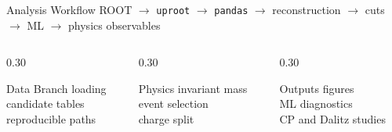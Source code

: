 \documentclass[aspectratio=169,10pt]{beamer}
\begin{document}
\begin{frame}{Analysis Workflow}
  \centering
  \vspace{0.2cm}
  {\large
  ROOT \(\rightarrow\) \texttt{uproot} \(\rightarrow\) \texttt{pandas}
  \(\rightarrow\) reconstruction \(\rightarrow\) cuts
  \(\rightarrow\) ML \(\rightarrow\) physics observables}

  \vspace{0.8cm}
  \begin{columns}[T,onlytextwidth]
    \begin{column}{0.30\textwidth}
      \begin{block}{Data}
        Branch loading\\
        candidate tables\\
        reproducible paths
      \end{block}
    \end{column}
    \begin{column}{0.30\textwidth}
      \begin{block}{Physics}
        invariant mass\\
        event selection\\
        charge split
      \end{block}
    \end{column}
    \begin{column}{0.30\textwidth}
      \begin{block}{Outputs}
        figures\\
        ML diagnostics\\
        CP and Dalitz studies
      \end{block}
    \end{column}
  \end{columns}
\end{frame}
\end{document}
